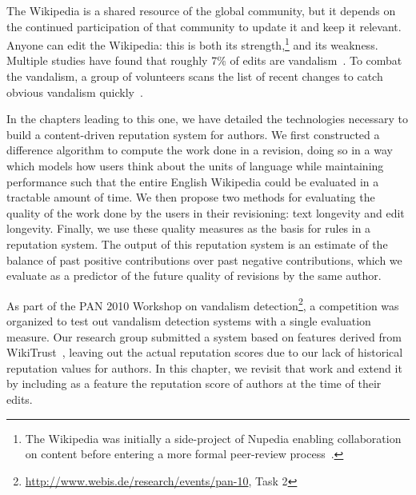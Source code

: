 
The Wikipedia is a shared resource of the global community, but it depends on
the continued participation of that community to update it and keep it relevant.
Anyone can edit the Wikipedia: this is both its strength,\footnote{The Wikipedia
was initially a side-project of Nupedia enabling collaboration on content
before entering a more formal peer-review process~\cite{wiki:Nupedia}.}
and its weakness.
Multiple studies have found that roughly 7\% of edits are
vandalism~\cite{Potthast2008,Potthast2010a}.
To combat the vandalism, a group of volunteers scans the list of recent changes
to catch obvious vandalism quickly~\cite{wiki:RCPatrol}.

In the chapters leading to this one, we have detailed the technologies
necessary to build a content-driven reputation system for authors.
We first constructed a difference algorithm to compute the work done in a
revision, doing so in a way which models how users think about the units of
language while maintaining performance such that the entire English Wikipedia
could be evaluated in a tractable amount of time.
We then propose two methods for evaluating the quality of the work done by the
users in their revisioning: text longevity and edit longevity.
Finally, we use these quality measures as the basis for rules in a reputation
system.
The output of this reputation system is an estimate of the balance of past
positive contributions over past negative contributions, which we evaluate
as a predictor of the future quality of revisions by the same author.

As part of the PAN 2010 Workshop on vandalism
detection\footnote{\url{http://www.webis.de/research/events/pan-10}, Task 2},
a competition was organized to test out vandalism detection systems with a
single evaluation measure.
Our research group submitted a system based on features derived from
WikiTrust~\cite{Adler2010}, leaving out the actual reputation scores due
to our lack of historical reputation values for authors.
In this chapter, we revisit that work and extend it by including as a feature
the reputation score of authors at the time of their edits.

